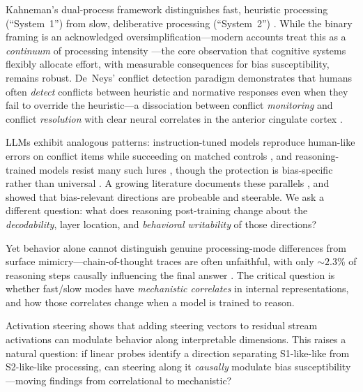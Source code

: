 \documentclass{article}
\newcommand{\sone}{S1-like}
\newcommand{\stwo}{S2-like}
\begin{document}
Kahneman's dual-process framework distinguishes fast, heuristic
processing (``System~1'') from slow, deliberative processing
(``System~2'') \citep{kahneman2011thinking}.  While the binary framing
is an acknowledged oversimplification---modern accounts treat this as a
\emph{continuum} of processing intensity \citep{melnikoff2018mythical,
evans2013dual, deneys2023advancing}---the core observation that
cognitive systems flexibly allocate effort, with measurable consequences
for bias susceptibility, remains robust.  De~Neys' conflict
detection paradigm \citep{deneys2012bias, deneys2017dual} demonstrates
that humans often \emph{detect} conflicts between heuristic and
normative responses even when they fail to override the heuristic---a
dissociation between conflict \emph{monitoring} and conflict
\emph{resolution} with clear neural correlates in the anterior cingulate
cortex \citep{botvinick2001conflict}.

LLMs exhibit analogous patterns: instruction-tuned models reproduce
human-like errors on conflict items while succeeding on matched controls
\citep{hagendorff2023human}, and reasoning-trained models resist many
such lures \citep{deepseekr1}, though the protection is bias-specific
rather than universal \citep{schwartz2025clinical}.  A growing literature
documents these parallels \citep{codaforno2025dual,
ziabari2025reasoning}, and \citet{huang2026cogbias} showed that
bias-relevant directions are probeable and steerable.  We ask a
different question: what does reasoning post-training change about the
\emph{decodability}, layer location, and \emph{behavioral writability}
of those directions?

Yet behavior alone cannot distinguish genuine processing-mode differences
from surface mimicry---chain-of-thought traces are often unfaithful,
with only ${\sim}2.3$\% of reasoning steps causally influencing the
final answer \citep{jiang2025aha, lanham2023measuring,
boppana2026reasoning}.  The critical question is whether fast/slow modes
have \emph{mechanistic correlates} in internal representations, and how
those correlates change when a model is trained to reason.

Activation steering \citep{turner2023activation, rimsky2024steering,
cox2026decoding} shows that adding steering vectors to residual stream
activations can modulate behavior along interpretable dimensions.  This raises a natural
question: if linear probes identify a direction separating \sone{}-like
from \stwo{}-like processing, can steering along it \emph{causally}
modulate bias susceptibility---moving findings from correlational to
mechanistic?
\end{document}
